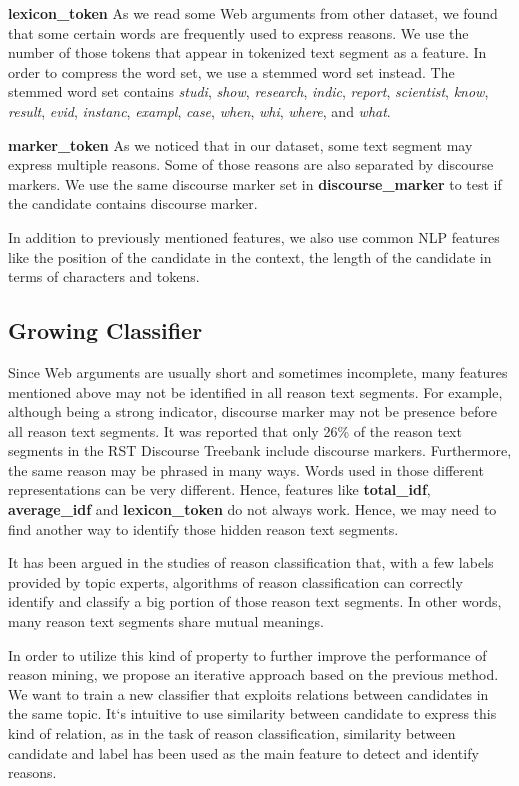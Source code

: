 \documentclass[11pt,a4paper]{article}
\begin{document}
{\bf lexicon\_token} As we read some Web arguments from other dataset, we found that some certain words are frequently used to express reasons. We use the number of those tokens that appear in tokenized text segment as a feature. In order to compress the word set, we use a stemmed word set instead. The stemmed word set contains {\it studi}, {\it show}, {\it research}, {\it indic}, {\it report}, {\it scientist}, {\it know}, {\it result}, {\it evid}, {\it instanc}, {\it exampl},  {\it case},  {\it when},  {\it whi},  {\it where}, and {\it what}.

{\bf marker\_token} As we noticed that in our dataset, some text segment may express multiple reasons. Some of those reasons are also separated by discourse markers. We use the same discourse marker set in {\bf discourse\_marker} to test if the candidate contains discourse marker.

In addition to previously mentioned features, we also use common NLP features like the position of the candidate in the context, the length of the candidate in terms of characters and tokens.


\subsection{Growing Classifier}

Since Web arguments are usually short and sometimes incomplete, many features mentioned above may not be identified in all reason text segments. For example, although being a strong indicator, discourse marker may not be presence before all reason text segments. It was reported that only 26\% of the reason text segments in the RST Discourse Treebank include discourse markers\cite{marcu2002unsupervised}. Furthermore, the same reason may be phrased in many ways. Words used in those different representations can be very different. Hence, features like {\bf total\_idf}, {\bf average\_idf} and {\bf lexicon\_token} do not always work. Hence, we may need to find another way to identify those hidden reason text segments. 

It has been argued in the studies of reason classification that, with a few labels provided by topic experts, algorithms of reason classification can correctly identify and classify a big portion of those reason text segments\cite{hasan2014you}. In other words, many reason text segments share mutual meanings. 

In order to utilize this kind of property to further improve the performance of reason mining, we propose an iterative approach based on the previous method. We want to train a new classifier that exploits relations between candidates in the same topic. It`s intuitive to use similarity between candidate to express this kind of relation, as in the task of reason classification, similarity between candidate and label has been used as the main feature to detect and identify reasons\cite{hasan2014you}. 
\end{document}

